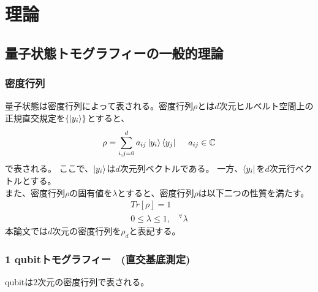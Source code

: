 \documentclass[11pt,a4j,notitlepage]{jreport}
\begin{document}
	\chapter{理論}
	\section{量子状態トモグラフィーの一般的理論}


	\subsection{密度行列}

	量子状態は密度行列によって表される。密度行列$\rho$とは$d$次元ヒルベルト空間上の正規直交規定を$\{ \ket{y_i} \}$とすると、
	\begin{equation}
		\rho = \sum_{i,j = 0}^d a_{ij} \ket{y_i} \bra{y_j}\ \ \ \ a_{ij} \in \mathbb{C}
	\end{equation}
	で表される。
	ここで、$\ket{y_i}$は$d$次元列ベクトルである。
	一方、$\bra{y_i}$を$d$次元行ベクトルとする。\\
	また、密度行列$\rho$の固有値を$\lambda$とすると、密度行列$\rho$は以下二つの性質を満たす。
	\begin{equation}
		\begin{gathered}
			Tr[\rho]=1 \\
			0 \leq \lambda \leq 1, \ \ \ \  ^\forall \lambda
		\end{gathered}
	\end{equation}
	本論文では$d$次元の密度行列を$\rho_d$と表記する。



	\subsection{1 qubitトモグラフィー　(直交基底測定)}

	qubitは$2$次元の密度行列で表される。
\end{document}
